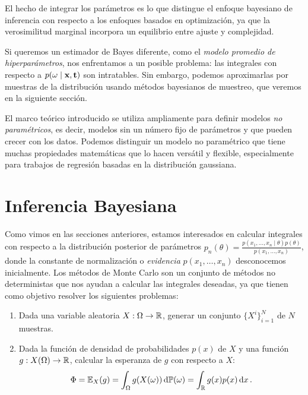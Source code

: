 El hecho de integrar los parámetros es lo que distingue el enfoque bayesiano de inferencia con respecto a los enfoques basados en optimización, ya que la verosimilitud marginal incorpora un equilibrio entre ajuste y complejidad.

Si queremos un estimador de Bayes diferente, como el \emph{modelo promedio de hiperparámetros}, nos enfrentamos a un posible problema: las integrales con respecto a \(p(\omega \mid \mathbf{x}, \mathbf{t})\) son intratables. Sin embargo, podemos aproximarlas por muestras de la distribución usando métodos bayesianos de muestreo, que veremos en la siguiente sección.

El marco teórico introducido se utiliza ampliamente para definir modelos \emph{no paramétricos}, es decir, modelos sin un número fijo de parámetros y que pueden crecer con los datos. Podemos distinguir un modelo no paramétrico que tiene muchas propiedades matemáticas que lo hacen versátil y flexible, especialmente para trabajos de regresión basadas en la distribución gaussiana.

\section{Inferencia Bayesiana}
Como vimos en las secciones anteriores, estamos interesados en calcular integrales con respecto a la distribución posterior de parámetros \(p_n(\theta) = \frac{p(x_1,\dots, x_n \mid \theta) p(\theta)}{p(x_1, \dots, x_n)}\), donde la constante de normalización o \emph{evidencia} \(p(x_1, \dots, x_n)\) desconocemos inicialmente. Los métodos de Monte Carlo son un conjunto de métodos no deterministas que nos ayudan a calcular las integrales deseadas, ya que tienen como objetivo resolver los siguientes problemas:
\begin{enumerate}
	\item Dada una variable aleatoria \(X : \Omega \to \mathbb{R}\), generar un conjunto \(\{X^i\}_{i=1}^N\) de \(N\) muestras.
	\item Dada la función de densidad de probabilidades \(p(x)\) de \(X\) y una función \(g : X(\Omega) \to \mathbb{R}\), calcular la esperanza de \(g\) con respecto a \(X\):
	\begin{equation*}
	\Phi = \mathbb{E}_{X}(g) = \int_\Omega g(X(\omega)) \dd{\mathbb{P}(\omega)} = \int_{\mathbb{R}} g(x) p(x) \dd{x}.
	\end{equation*}
\end{enumerate}


